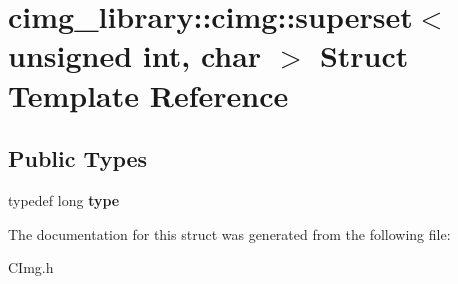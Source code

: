 \hypertarget{structcimg__library_1_1cimg_1_1superset_3_01unsigned_01int_00_01char_01_4}{\section{cimg\-\_\-library\-:\-:cimg\-:\-:superset$<$ unsigned int, char $>$ Struct Template Reference}
\label{structcimg__library_1_1cimg_1_1superset_3_01unsigned_01int_00_01char_01_4}
}
\subsection*{Public Types}
\begin{DoxyCompactItemize}
\item 
\hypertarget{structcimg__library_1_1cimg_1_1superset_3_01unsigned_01int_00_01char_01_4_ab86a8f66c34d3ff06a5d902d6b383643}{typedef long {\bfseries type}}\label{structcimg__library_1_1cimg_1_1superset_3_01unsigned_01int_00_01char_01_4_ab86a8f66c34d3ff06a5d902d6b383643}

\end{DoxyCompactItemize}


The documentation for this struct was generated from the following file\-:\begin{DoxyCompactItemize}
\item 
C\-Img.\-h\end{DoxyCompactItemize}
